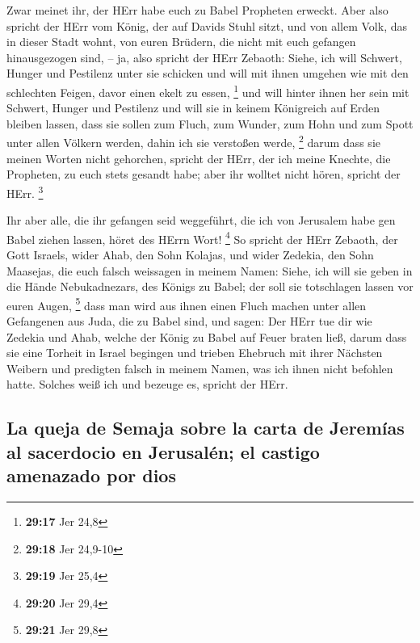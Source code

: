  Zwar meinet ihr, der HErr habe euch zu Babel Propheten
erweckt.  Aber also spricht der HErr vom König, der auf
Davids Stuhl sitzt, und von allem Volk, das in dieser Stadt wohnt, von
euren Brüdern, die nicht mit euch gefangen hinausgezogen sind,
 -- ja, also spricht der HErr Zebaoth: Siehe, ich will
Schwert, Hunger und Pestilenz unter sie schicken und will mit ihnen
umgehen wie mit den schlechten Feigen, davor einen ekelt zu essen,
\footnote{\textbf{29:17} Jer 24,8}  und will hinter ihnen
her sein mit Schwert, Hunger und Pestilenz und will sie in keinem
Königreich auf Erden bleiben lassen, dass sie sollen zum Fluch, zum
Wunder, zum Hohn und zum Spott unter allen Völkern werden, dahin ich sie
verstoßen werde, \footnote{\textbf{29:18} Jer 24,9-10} 
darum dass sie meinen Worten nicht gehorchen, spricht der HErr, der ich
meine Knechte, die Propheten, zu euch stets gesandt habe; aber ihr
wolltet nicht hören, spricht der HErr. \footnote{\textbf{29:19} Jer 25,4}

 Ihr aber alle, die ihr gefangen seid weggeführt, die ich
von Jerusalem habe gen Babel ziehen lassen, höret des HErrn Wort!
\footnote{\textbf{29:20} Jer 29,4}  So spricht der HErr
Zebaoth, der Gott Israels, wider Ahab, den Sohn Kolajas, und wider
Zedekia, den Sohn Maasejas, die euch falsch weissagen in meinem Namen:
Siehe, ich will sie geben in die Hände Nebukadnezars, des Königs zu
Babel; der soll sie totschlagen lassen vor euren Augen, \footnote{\textbf{29:21}
  Jer 29,8}  dass man wird aus ihnen einen Fluch machen
unter allen Gefangenen aus Juda, die zu Babel sind, und sagen: Der HErr
tue dir wie Zedekia und Ahab, welche der König zu Babel auf Feuer braten
ließ,  darum dass sie eine Torheit in Israel begingen und
trieben Ehebruch mit ihrer Nächsten Weibern und predigten falsch in
meinem Namen, was ich ihnen nicht befohlen hatte. Solches weiß ich und
bezeuge es, spricht der HErr.

\hypertarget{la-queja-de-semaja-sobre-la-carta-de-jeremuxedas-al-sacerdocio-en-jerusaluxe9n-el-castigo-amenazado-por-dios}{%
\subsection{La queja de Semaja sobre la carta de Jeremías al sacerdocio
en Jerusalén; el castigo amenazado por
dios}\label{la-queja-de-semaja-sobre-la-carta-de-jeremuxedas-al-sacerdocio-en-jerusaluxe9n-el-castigo-amenazado-por-dios}}


